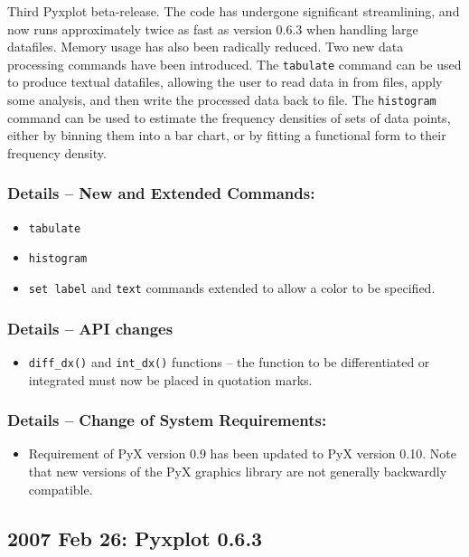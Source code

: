 Third Pyxplot beta-release. The code has undergone significant streamlining,
and now runs approximately twice as fast as version 0.6.3 when handling large
datafiles. Memory usage has also been radically reduced. Two new data
processing commands have been introduced. The {\tt tabulate} command can be
used to produce textual datafiles, allowing the user to read data in from
files, apply some analysis, and then write the processed data back to file. The
{\tt histogram} command can be used to estimate the frequency densities of sets
of data points, either by binning them into a bar chart, or by fitting a
functional form to their frequency density.

\subsubsection*{Details -- New and Extended Commands:}

\begin{itemize}
\item {\tt tabulate}
\item {\tt histogram}
\item {\tt set label} and {\tt text} commands extended to allow a color to be
specified.
\end{itemize}

\subsubsection*{Details -- API changes}

\begin{itemize}
\item {\tt diff\_dx()} and {\tt int\_dx()} functions -- the function to be
differentiated or integrated must now be placed in quotation marks.
\end{itemize}

\subsubsection*{Details -- Change of System Requirements:}

\begin{itemize}
\item Requirement of PyX version 0.9 has been updated to PyX version 0.10. Note that new versions of the PyX graphics library are not generally backwardly compatible.
\end{itemize}

\subsection*{2007 Feb 26: Pyxplot 0.6.3}

